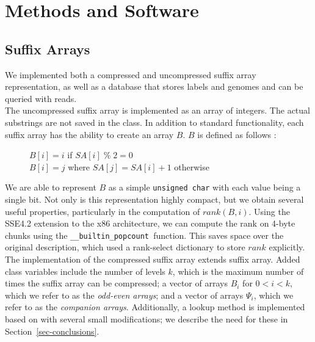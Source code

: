 \documentclass{article}
\newcommand{\popcnt}{\texttt{\_\_builtin\_popcount }}
\begin{document}
\section{Methods and Software}
\label{sec-methods-software}
\subsection{Suffix Arrays}
\label{subsec-sa}
We implemented both a compressed and uncompressed suffix array representation, as well as a database that stores labels and genomes and can be queried with reads.\\
\indent The uncompressed suffix array is implemented as an array of integers. The actual substrings are not saved in the class. In addition to standard functionality, each suffix array has the ability to create an array $B$. $B$ is defined as follows \cite{GV05}:
\begin{figure}[H]
\label{fig-defn-b}
$B[i] = i$ if $SA[i]\;\%\; 2 = 0$\\
$B[i] = j$ where $SA[j] = SA[i]+1$ otherwise
\end{figure}
\indent We are able to represent $B$ as a simple \texttt{unsigned char\*} with each value being a single bit. Not only is this representation highly compact, but we obtain several useful properties, particularly in the computation of $rank(B,i)$. Using the SSE4.2 extension to the x86 architecture, we can compute the rank on 4-byte chunks using the \popcnt function. This saves space over the original description, which used a rank-select dictionary to store $rank$ explicitly.\\
\indent The implementation of the compressed suffix array extends suffix array. Added class variables include the number of levels $k$, which is the maximum number of times the suffix array can be compressed; a vector of arrays $B_i$ for $0 < i < k$, which we refer to as the \emph{odd-even arrays}; and a vector of arrays $\Psi_i$, which we refer to as the \emph{companion arrays}. Additionally, a lookup method is implemented based on \cite{GV05} with several small modifications; we describe the need for these in Section~\ref{sec-conclusions}.\\
\end{document}
